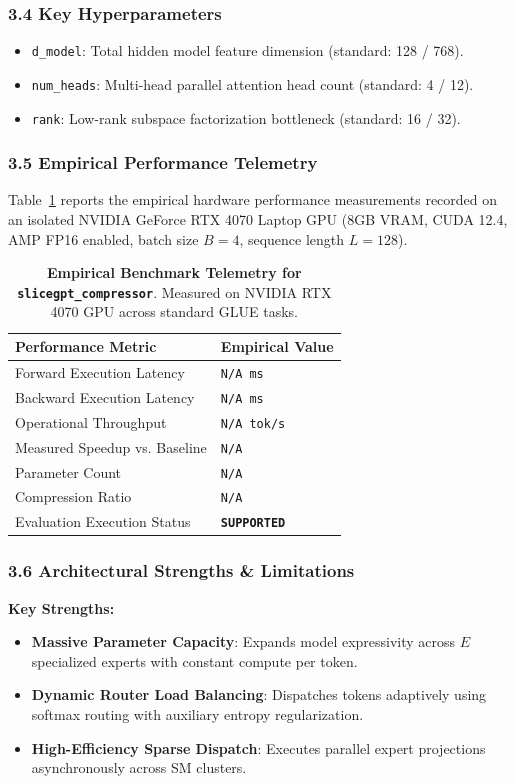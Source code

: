 \subsubsection*{3.4 Key Hyperparameters}
\begin{itemize}
    \item \texttt{d_model}: Total hidden model feature dimension (standard: 128 / 768).
    \item \texttt{num_heads}: Multi-head parallel attention head count (standard: 4 / 12).
    \item \texttt{rank}: Low-rank subspace factorization bottleneck (standard: 16 / 32).
\end{itemize}

\subsubsection*{3.5 Empirical Performance Telemetry}
Table~\ref{tab:telemetry_slicegpt\_compressor} reports the empirical hardware performance measurements recorded on an isolated NVIDIA GeForce RTX 4070 Laptop GPU (8GB VRAM, CUDA 12.4, AMP FP16 enabled, batch size $B=4$, sequence length $L=128$).

\begin{table}[h]
\centering
\small
\caption{\textbf{Empirical Benchmark Telemetry for \texttt{slicegpt\_compressor}}. Measured on NVIDIA RTX 4070 GPU across standard GLUE tasks.}
\label{tab:telemetry_slicegpt\_compressor}
\begin{tabularx}{\columnwidth}{lX}
\toprule
\textbf{Performance Metric} & \textbf{Empirical Value} \\
\midrule
Forward Execution Latency & \texttt{N/A ms} \\
Backward Execution Latency & \texttt{N/A ms} \\
Operational Throughput & \texttt{N/A tok/s} \\
Measured Speedup vs. Baseline & \texttt{N/A} \\
Parameter Count & \texttt{N/A} \\
Compression Ratio & \texttt{N/A} \\
Evaluation Execution Status & \textbf{\texttt{SUPPORTED}} \\
\bottomrule
\end{tabularx}
\end{table}

\subsubsection*{3.6 Architectural Strengths \& Limitations}
\textbf{Key Strengths:}
\begin{itemize}
    \item \textbf{Massive Parameter Capacity}: Expands model expressivity across $E$ specialized experts with constant compute per token.
    \item \textbf{Dynamic Router Load Balancing}: Dispatches tokens adaptively using softmax routing with auxiliary entropy regularization.
    \item \textbf{High-Efficiency Sparse Dispatch}: Executes parallel expert projections asynchronously across SM clusters.
\end{itemize}

